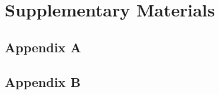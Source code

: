 \documentclass[11pt, a4paper, titles]{report}  %
\begin{document}
\setcounter{secnumdepth}{-2}%

\printbibliography 


\cleardoublepage
{}
{}
\chapter*{\huge\centering Supplementary Materials}  
\section{Appendix A}
%
\section{Appendix B}

\end{document}
